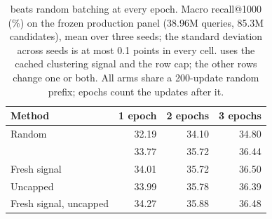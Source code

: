 \begin{table}[t]
  \caption{\ours{} beats random batching at every epoch. Macro recall@1000 (\%) on the frozen production panel (38.96M queries, 85.3M candidates), mean over three seeds; the standard deviation across seeds is at most 0.1 points in every cell. \ours{} uses the cached clustering signal and the row cap; the other rows change one or both. All arms share a 200-update random prefix; epochs count the updates after it.}
  \label{tab:internal}
  \footnotesize\setlength{\tabcolsep}{4pt}
  \begin{tabular}{lrrr}
    \toprule
    Method & 1 epoch & 2 epochs & 3 epochs \\
    \midrule
Random & 32.19 & 34.10 & 34.80 \\
\ours{} & 33.77 & 35.72 & 36.44 \\
Fresh signal & 34.01 & 35.72 & 36.50 \\
Uncapped & 33.99 & 35.78 & 36.39 \\
Fresh signal, uncapped & 34.27 & 35.88 & 36.48 \\
    \bottomrule
  \end{tabular}
\end{table}
